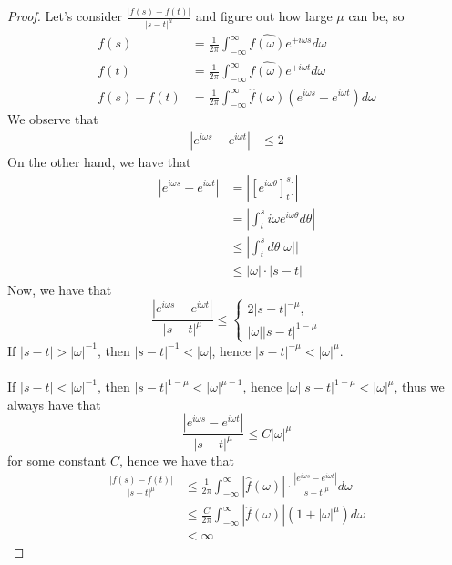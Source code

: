 \documentclass{article}
\begin{document}
\begin{proof}
    Let's consider $\frac{|f(s) - f(t)|}{|s - t|^\mu}$ and figure out how large $\mu$ can be, so
    \begin{align*}
        f(s) &= \frac{1}{2\pi} \int_{-\infty}^\infty \widehat{f(\omega)} e^{+i\omega s} d\omega\\
        f(t) &= \frac{1}{2\pi} \int_{-\infty}^\infty \widehat{f(\omega)} e^{+i\omega t} d\omega\\
        f(s) - f(t) &= \frac{1}{2\pi} \int_{-\infty}^\infty \widehat{f}(\omega) (e^{i\omega s} - e^{i\omega t}) d\omega
    \end{align*}
    We observe that
    \begin{align*}
        |e^{i\omega s} - e^{i \omega t}| &\leq 2 \tag*{By Triangle's Inequality, this is best bound when $\omega >> 0$} 
    \end{align*}
    On the other hand, we have that
    \begin{align*}
        |e^{i\omega s} - e^{i \omega t}|  &= |[e^{i \omega \theta}]_t^s]|\\
        &= |\int_{t}^s i \omega e^{i \omega \theta} d\theta|\\
        &\leq |\int_t^s d\theta |\omega||\\
        &\leq |\omega| \cdot |s - t| \tag*{Good when $s$ is close to $t$ and $\omega$ is small}
    \end{align*}
    Now, we have that
    \[        \frac{|e^{i\omega s} - e^{i \omega t}|}{|s - t|^\mu} \leq \begin{cases}
            2|s - t|^{-\mu},\\
            |\omega| |s - t|^{1-\mu}
        \end{cases}\]
    If $|s - t| > |\omega|^{-1}$, then $|s - t|^{-1} < |\omega|$, hence $|s - t|^{-\mu} < |\omega|^\mu$.\\\\
    If $|s - t| < |\omega|^{-1}$, then $|s - t|^{1- \mu} < |\omega|^{\mu - 1}$, hence $|\omega| |s - t|^{1-\mu} < |\omega|^\mu$, thus we always have that
    \[ \frac{|e^{i\omega s} - e^{i \omega t}|}{|s - t|^\mu} \leq  C |\omega|^\mu\]
    for some constant $C$, hence we have that
    \begin{align*}
    \frac{|f(s) - f(t)|}{|s - t|^\mu} &\leq \frac{1}{2\pi} \int_{-\infty}^\infty |\widehat{f}(\omega)| \cdot \frac{|e^{i\omega s} - e^{i\omega t}|}{|s - t|^\mu} d\omega\\
    &\leq \frac{C}{2\pi} \int_{-\infty}^\infty |\widehat{f}(\omega)| (1 + |\omega|^\mu) d\omega\\
    &< \infty
    \end{align*}
\end{proof}
\end{document}
